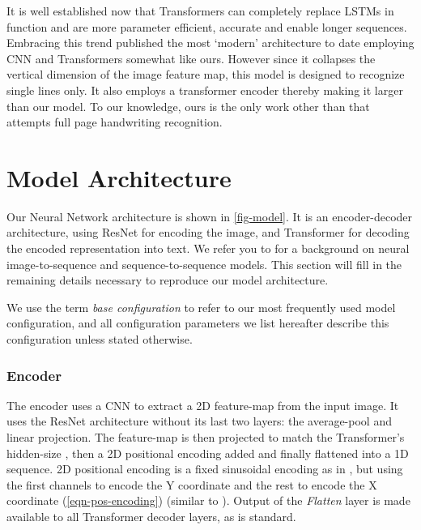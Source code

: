 \documentclass[runningheads]{llncs}
\begin{document}
It is well established now that Transformers can completely replace {\small LSTMs} in function and are more parameter efficient, accurate and enable longer sequences.
Embracing this trend \citet{kang2020pay} published the most `modern' architecture to date employing {\small CNN} and Transformers somewhat like ours. However since it collapses the vertical dimension of the image feature map, this model is designed to recognize single lines only. It also employs a transformer encoder thereby making it larger than our model. To our knowledge, ours is the only work other than \citep{DBLP:journals/corr/BlucheLM16} that attempts full page handwriting recognition.

\section{Model Architecture}
Our Neural Network architecture is shown in \autoref{fig-model}.
It is an encoder-decoder architecture, using ResNet \citep{DBLP:journals/corr/HeZRS15} for encoding the image, and Transformer \citep{DBLP:journals/corr/VaswaniSPUJGKP17} for decoding the encoded representation into text.
We refer you to \citep{Xu2015ShowAA,DBLP:journals/corr/abs-1802-05415,DBLP:journals/corr/VaswaniSPUJGKP17,DBLP:journals/corr/SutskeverVL14} for a background on neural image-to-sequence and sequence-to-sequence models.
This section will fill in the remaining details necessary to reproduce our model architecture.

We use the term \emph{base configuration} to refer to our most frequently used model configuration, and all configuration parameters we list hereafter describe this configuration unless stated otherwise.

\subsubsection{Encoder}
 The encoder uses a {\small CNN} to extract a 2D feature-map from the input image.
 It uses the ResNet architecture without its last two layers: the average-pool and linear projection.
 The feature-map is then projected to match the Transformer's hidden-size , then a 2D positional encoding added and finally flattened into a 1D sequence.
 2D positional encoding is a fixed sinusoidal encoding as in \citep{DBLP:journals/corr/VaswaniSPUJGKP17}, but using the first  channels to encode the Y coordinate and the rest to encode the X coordinate (\autoref{eqn-pos-encoding}) (similar to \citep{parmar2018image}).
 Output  of the \emph{Flatten} layer is made available to all Transformer decoder layers, as is standard.
\end{document}
